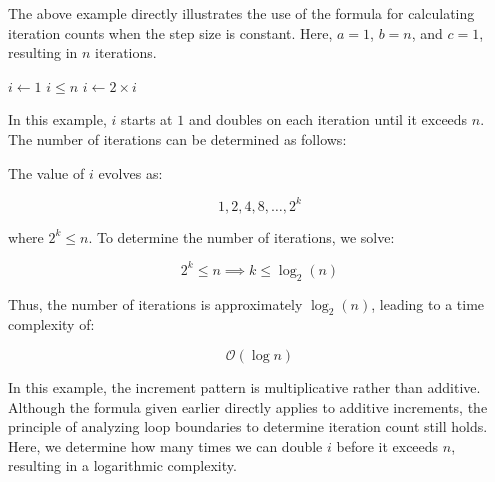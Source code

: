 The above example directly illustrates the use of the formula for calculating iteration counts when the step size is constant. Here, $a = 1$, $b = n$, and $c = 1$, resulting in $n$ iterations.

\begin{example}

    \begin{codebox}
        \li $i \gets 1$
        \li \While $i \leq n$ \Do
        \li     {}
        \li     $i \gets 2 \times i$
            \End
    \end{codebox}
    
    In this example, $i$ starts at $1$ and doubles on each iteration until it exceeds $n$. The number of iterations can be determined as follows:
    
    The value of $i$ evolves as:
    
    \[
    1, 2, 4, 8, \dots, 2^k
    \]
    
    where $2^k \leq n$. To determine the number of iterations, we solve:
    
    \[
    2^k \leq n \implies k \leq \log_2(n)
    \]
    
    Thus, the number of iterations is approximately $\log_2(n)$, leading to a time complexity of:
    
    \[
    \mathcal{O}(\log n)
    \]
    
    In this example, the increment pattern is multiplicative rather than additive. Although the formula given earlier directly applies to additive increments, the principle of analyzing loop boundaries to determine iteration count still holds. Here, we determine how many times we can double $i$ before it exceeds $n$, resulting in a logarithmic complexity.

\end{example}

